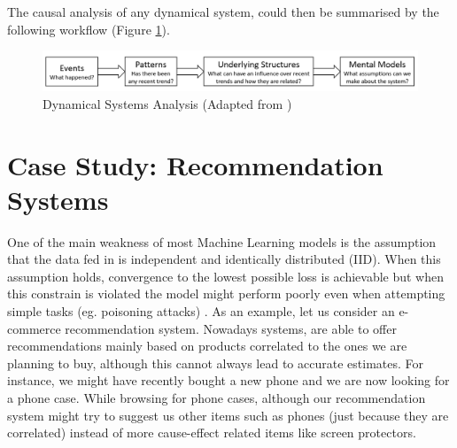 The causal analysis of any dynamical system, could then be summarised by the following workflow (Figure \ref{wow2}). 

\begin{figure}[ht!]%
    \centering
    \includegraphics[width=1\linewidth]{latex/images/discover.pdf}
    \vspace{-0.6cm}
    \caption{Dynamical Systems Analysis (Adapted from \cite{system})}
    \label{wow2}
\end{figure}
\vspace{-0.5cm}

\section{Case Study: Recommendation Systems}

One of the main weakness of most Machine Learning models is the assumption that the data fed in is independent and identically distributed (IID). When this assumption holds, convergence to the lowest possible loss is achievable but when this constrain is violated the model might perform poorly even when attempting simple tasks (eg. poisoning attacks) \cite{six}.
As an example, let us consider an e-commerce recommendation system. Nowadays systems, are able to offer recommendations mainly based on products correlated to the ones we are planning to buy, although this cannot always lead to accurate estimates. For instance, we might have recently bought a new phone and we are now looking for a phone case. While browsing for phone cases, although our recommendation system might try to suggest us other items such as phones (just because they are correlated) instead of more cause-effect related items like screen protectors.



